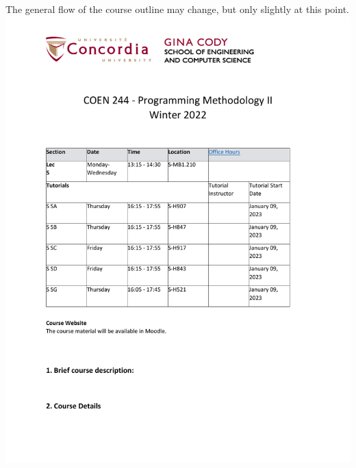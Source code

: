 \documentclass{CourseOutline}
\begin{document}
The general flow of the course outline may change, but only slightly at this point. \\

\newpage
\includegraphics[page=3,rviewport=0.11 0.05 0.9 0.96, scale=0.95, clip=true]{2022_COEN244_4_S_1_outline.pdf}
\newpage
\end{document}
